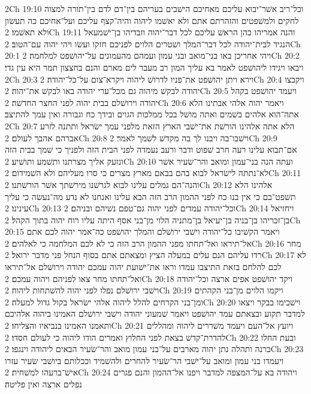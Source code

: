 2Ch 19:10  וכל־ריב אשׁר־יבוא עליכם מאחיכם הישׁבים בעריהם בין־דם לדם בין־תורה למצוה לחקים ולמשׁפטים והזהרתם אתם ולא יאשׁמו ליהוה והיה־קצף עליכם ועל־אחיכם כה תעשׂון ולא תאשׁמו׃
2Ch 19:11  והנה אמריהו כהן הראשׁ עליכם לכל דבר־יהוה וזבדיהו בן־ישׁמעאל הנגיד לבית־יהודה לכל דבר־המלך ושׁטרים הלוים לפניכם חזקו ועשׂו ויהי יהוה עם־הטוב׃
2Ch 20:1  ויהי אחריכן באו בני־מואב ובני עמון ועמהם מהעמונים על־יהושׁפט למלחמה׃
2Ch 20:2  ויבאו ויגידו ליהושׁפט לאמר בא עליך המון רב מעבר לים מארם והנם בחצצון תמר היא עין גדי׃
2Ch 20:3  וירא ויתן יהושׁפט את־פניו לדרושׁ ליהוה ויקרא־צום על־כל־יהודה׃
2Ch 20:4  ויקבצו יהודה לבקשׁ מיהוה גם מכל־ערי יהודה באו לבקשׁ את־יהוה׃
2Ch 20:5  ויעמד יהושׁפט בקהל יהודה וירושׁלם בבית יהוה לפני החצר החדשׁה׃
2Ch 20:6  ויאמר יהוה אלהי אבתינו הלא אתה־הוא אלהים בשׁמים ואתה מושׁל בכל ממלכות הגוים ובידך כח וגבורה ואין עמך להתיצב׃
2Ch 20:7  הלא אתה אלהינו הורשׁת את־ישׁבי הארץ הזאת מלפני עמך ישׂראל ותתנה לזרע אברהם אהבך לעולם׃
2Ch 20:8  וישׁבו־בה ויבנו לך בה מקדשׁ לשׁמך לאמר׃
2Ch 20:9  אם־תבוא עלינו רעה חרב שׁפוט ודבר ורעב נעמדה לפני הבית הזה ולפניך כי שׁמך בבית הזה ונזעק אליך מצרתנו ותשׁמע ותושׁיע׃
2Ch 20:10  ועתה הנה בני־עמון ומואב והר־שׂעיר אשׁר לא־נתתה לישׂראל לבוא בהם בבאם מארץ מצרים כי סרו מעליהם ולא השׁמידום׃
2Ch 20:11  והנה־הם גמלים עלינו לבוא לגרשׁנו מירשׁתך אשׁר הורשׁתנו׃
2Ch 20:12  אלהינו הלא תשׁפט־בם כי אין בנו כח לפני ההמון הרב הזה הבא עלינו ואנחנו לא נדע מה־נעשׂה כי עליך עינינו׃
2Ch 20:13  וכל־יהודה עמדים לפני יהוה גם־טפם נשׁיהם ובניהם׃
2Ch 20:14  ויחזיאל בן־זכריהו בן־בניה בן־יעיאל בן־מתניה הלוי מן־בני אסף היתה עליו רוח יהוה בתוך הקהל׃
2Ch 20:15  ויאמר הקשׁיבו כל־יהודה וישׁבי ירושׁלם והמלך יהושׁפט כה־אמר יהוה לכם אתם אל־תיראו ואל־תחתו מפני ההמון הרב הזה כי לא לכם המלחמה כי לאלהים׃
2Ch 20:16  מחר רדו עליהם הנם עלים במעלה הציץ ומצאתם אתם בסוף הנחל פני מדבר ירואל׃
2Ch 20:17  לא לכם להלחם בזאת התיצבו עמדו וראו את־ישׁועת יהוה עמכם יהודה וירושׁלם אל־תיראו ואל־תחתו מחר צאו לפניהם ויהוה עמכם׃
2Ch 20:18  ויקד יהושׁפט אפים ארצה וכל־יהודה וישׁבי ירושׁלם נפלו לפני יהוה להשׁתחות ליהוה׃
2Ch 20:19  ויקמו הלוים מן־בני הקהתים ומן־בני הקרחים להלל ליהוה אלהי ישׂראל בקול גדול למעלה׃
2Ch 20:20  וישׁכימו בבקר ויצאו למדבר תקוע ובצאתם עמד יהושׁפט ויאמר שׁמעוני יהודה וישׁבי ירושׁלם האמינו ביהוה אלהיכם ותאמנו האמינו בנביאיו והצליחו׃
2Ch 20:21  ויועץ אל־העם ויעמד משׁררים ליהוה ומהללים להדרת־קדשׁ בצאת לפני החלוץ ואמרים הודו ליהוה כי לעולם חסדו׃
2Ch 20:22  ובעת החלו ברנה ותהלה נתן יהוה מארבים על־בני עמון מואב והר־שׂעיר הבאים ליהודה וינגפו׃
2Ch 20:23  ויעמדו בני עמון ומואב על־ישׁבי הר־שׂעיר להחרים ולהשׁמיד וככלותם ביושׁבי שׂעיר עזרו אישׁ־ברעהו למשׁחית׃
2Ch 20:24  ויהודה בא על־המצפה למדבר ויפנו אל־ההמון והנם פגרים נפלים ארצה ואין פליטה׃
